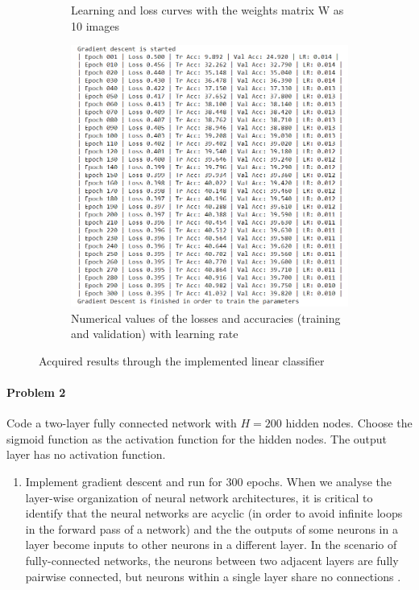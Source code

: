\documentclass[11pt]{scrartcl}
\begin{document}
{\begin{enumerate}[label=(\alph*)]
\begin{figure}[H]
\begin{subfigure}{.5\textwidth}
  \caption{Learning and loss curves with the weights matrix W as 10 images}
  \label{fig:sub1}
\end{subfigure}%
\begin{subfigure}{0.5\textwidth}
  \centering
  \includegraphics[width=0.7\linewidth]{1_1.PNG}
  \caption{Numerical values of the losses and accuracies (training and validation) with learning rate}
  \label{fig:sub2}
\end{subfigure}
\caption{Acquired results through the implemented linear classifier}
\label{fig:test}
\end{figure}
\end{enumerate}

\paragraph*{Problem 2}
Code a two-layer fully connected network with $H = 200$ hidden nodes. Choose the sigmoid function as the activation function for the hidden nodes. The output layer has no activation function.
\begin{enumerate}[label=(\alph*)]
\item Implement gradient descent and run for 300 epochs.
\newline When we analyse the layer-wise organization of neural network architectures, it is critical to identify that the neural networks are acyclic (in order to avoid infinite loops in the forward pass of a network) and the the outputs of some neurons in a layer become inputs to other neurons in a different layer. In the scenario of fully-connected networks, the neurons between two adjacent layers are fully pairwise connected, but neurons within a single layer share no connections \cite{web1}.


\end{enumerate}}
\end{document}
